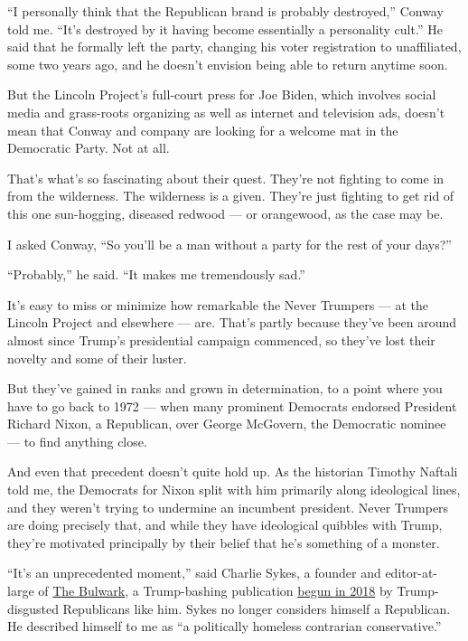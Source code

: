 ``I personally think that the Republican brand is probably destroyed,''
Conway told me. ``It's destroyed by it having become essentially a
personality cult.'' He said that he formally left the party, changing
his voter registration to unaffiliated, some two years ago, and he
doesn't envision being able to return anytime soon.

But the Lincoln Project's full-court press for Joe Biden, which involves
social media and grass-roots organizing as well as internet and
television ads, doesn't mean that Conway and company are looking for a
welcome mat in the Democratic Party. Not at all.

That's what's so fascinating about their quest. They're not fighting to
come in from the wilderness. The wilderness is a given. They're just
fighting to get rid of this one sun-hogging, diseased redwood --- or
orangewood, as the case may be.

I asked Conway, ``So you'll be a man without a party for the rest of
your days?''

``Probably,'' he said. ``It makes me tremendously sad.''

It's easy to miss or minimize how remarkable the Never Trumpers --- at
the Lincoln Project and elsewhere --- are. That's partly because they've
been around almost since Trump's presidential campaign commenced, so
they've lost their novelty and some of their luster.

But they've gained in ranks and grown in determination, to a point where
you have to go back to 1972 --- when many prominent Democrats endorsed
President Richard Nixon, a Republican, over George McGovern, the
Democratic nominee --- to find anything close.

And even that precedent doesn't quite hold up. As the historian Timothy
Naftali told me, the Democrats for Nixon split with him primarily along
ideological lines, and they weren't trying to undermine an incumbent
president. Never Trumpers are doing precisely that, and while they have
ideological quibbles with Trump, they're motivated principally by their
belief that he's something of a monster.

``It's an unprecedented moment,'' said Charlie Sykes, a founder and
editor-at-large of \href{https://thebulwark.com/}{The Bulwark}, a
Trump-bashing publication
\href{https://www.theatlantic.com/politics/archive/2019/02/bulwarks-quest-shame-high-profile-trump-backers/583354/}{begun
in 2018} by Trump-disgusted Republicans like him. Sykes no longer
considers himself a Republican. He described himself to me as ``a
politically homeless contrarian conservative.''

